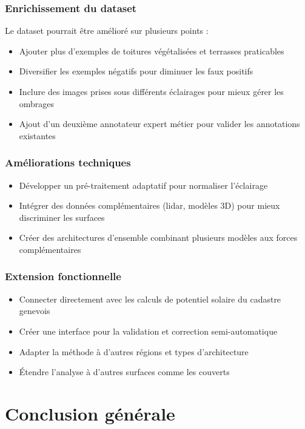 \subsubsection{Enrichissement du dataset}
Le dataset pourrait être amélioré sur plusieurs points :
\begin{itemize}
    \item Ajouter plus d'exemples de toitures végétalisées et terrasses praticables
    \item Diversifier les exemples négatifs pour diminuer les faux positifs
    \item Inclure des images prises sous différents éclairages pour mieux gérer les ombrages
    \item Ajout d'un deuxième annotateur expert métier pour valider les annotations existantes
\end{itemize}

\subsubsection{Améliorations techniques}
\begin{itemize}
    \item Développer un pré-traitement adaptatif pour normaliser l'éclairage
    \item Intégrer des données complémentaires (\gls{lidar}, modèles 3D) pour mieux discriminer les surfaces
    \item Créer des architectures d'ensemble combinant plusieurs modèles aux forces complémentaires
\end{itemize}

\subsubsection{Extension fonctionnelle}
\begin{itemize}
    \item Connecter directement avec les calculs de potentiel solaire du cadastre genevois
    \item Créer une interface pour la validation et correction semi-automatique
    \item Adapter la méthode à d'autres régions et types d'architecture
    \item Étendre l'analyse à d'autres surfaces comme les couverts
\end{itemize}

\section{Conclusion générale}

